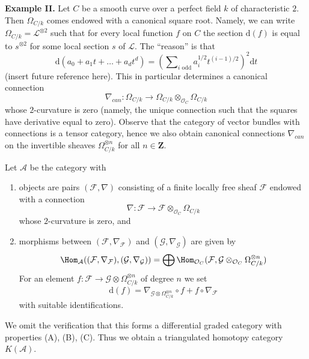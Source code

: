 \medskip\noindent
{\bf Example II.} Let $C$ be a smooth curve over a perfect field $k$ of
characteristic $2$. Then $\Omega_{C/k}$ comes endowed with a canonical
square root. Namely, we can write $\Omega_{C/k} = \mathcal{L}^{\otimes 2}$
such that for every local function $f$ on $C$ the section
$\text{d}(f)$ is equal to $s^{\otimes 2}$ for some local section
$s$ of $\mathcal{L}$. The ``reason'' is that
$$
\text{d}(a_0 + a_1t + \ldots +a_dt^d) =
(\sum\nolimits_{i\text{ odd}} a_i^{1/2} t^{(i - 1)/2})^2\text{d}t
$$
(insert future reference here). This in particular determines a
canonical connection
$$
\nabla_{can} :
\Omega_{C/k}
\longrightarrow
\Omega_{C/k} \otimes_{\mathcal{O}_C} \Omega_{C/k}
$$
whose $2$-curvature is zero (namely, the unique connection such that the
squares have derivative equal to zero).
Observe that the category of vector bundles
with connections is a tensor category, hence we also obtain canonical
connections $\nabla_{can}$ on the invertible sheaves
$\Omega_{C/k}^{\otimes n}$ for all $n \in \mathbf{Z}$.

\medskip\noindent
Let $\mathcal{A}$ be the category with
\begin{enumerate}
\item objects are pairs $(\mathcal{F}, \nabla)$ consisting of a
finite locally free sheaf $\mathcal{F}$ endowed with a connection
$$
\nabla :
\mathcal{F}
\longrightarrow
\mathcal{F} \otimes_{\mathcal{O}_C} \Omega_{C/k}
$$
whose $2$-curvature is zero, and
\item morphisms between $(\mathcal{F}, \nabla_\mathcal{F})$ and
$(\mathcal{G}, \nabla_\mathcal{G})$
are given by
$$
\Hom_\mathcal{A}((\mathcal{F}, \nabla_\mathcal{F}),
(\mathcal{G}, \nabla_\mathcal{G})) =
\bigoplus \Hom_{\mathcal{O}_C}(\mathcal{F},
\mathcal{G} \otimes_{\mathcal{O}_C} \Omega_{C/k}^{\otimes n})
$$
For an element
$f : \mathcal{F} \to \mathcal{G} \otimes \Omega_{C/k}^{\otimes n}$
of degree $n$ we set
$$
\text{d}(f) =
\nabla_{\mathcal{G} \otimes \Omega_{C/k}^{\otimes n}} \circ f +
f \circ \nabla_\mathcal{F}
$$
with suitable identifications.
\end{enumerate}
We omit the verification that this forms a differential graded
category with properties (A), (B), (C). Thus we obtain a triangulated
homotopy category $K(\mathcal{A})$.

